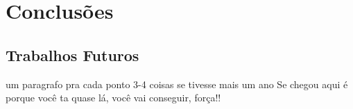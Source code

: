 \chapter{Conclusões}
\label{chap7}
 \section{Trabalhos Futuros}
 um paragrafo pra cada ponto 3-4 coisas se tivesse mais um ano
Se chegou aqui é porque você ta quase lá, você vai conseguir, força!!
